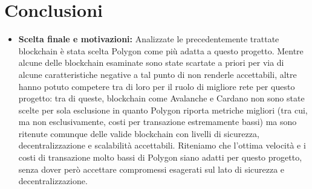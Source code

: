 \documentclass[a4paper, 12pt]{article}
\begin{document}
\section*{Conclusioni}
\begin{itemize}

    \item \textbf{Scelta finale e motivazioni: }
    Analizzate le precedentemente trattate blockchain è stata scelta Polygon come più adatta a questo progetto.
    Mentre alcune delle blockchain esaminate sono state scartate a priori per via di alcune caratteristiche negative a tal punto di non renderle
    accettabili, altre hanno potuto competere tra di loro per il ruolo di migliore rete per questo progetto: tra di queste, blockchain come Avalanche e Cardano
    non sono state scelte per sola esclusione in quanto Polygon riporta metriche migliori (tra cui, ma non esclusivamente, costi per transazione estremamente bassi) ma sono
    ritenute comunque delle valide blockchain con livelli di sicurezza, decentralizzazione e scalabilità accettabili.
    Riteniamo che l'ottima velocità e i costi di transazione molto bassi di Polygon siano adatti per questo progetto, senza dover però accettare
    compromessi esagerati sul lato di sicurezza e decentralizzazione.\\


\end{itemize}
\end{document}
